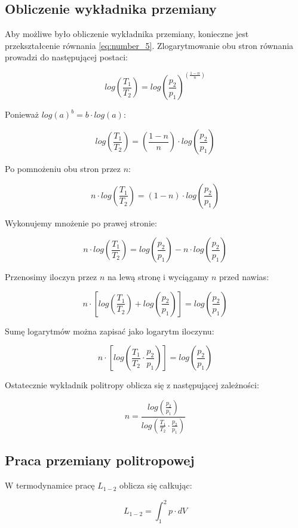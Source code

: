 \subsection{Obliczenie wykładnika przemiany }
Aby możliwe było obliczenie wykładnika przemiany, konieczne jest przekształcenie równania \eqref{eq:number_5}. Zlogarytmowanie obu stron równania prowadzi do następującej postaci:

\[log \left( \frac{T_1}{T_2} \right) = log \left( \frac{p_2}{p_1} \right)^ {\left( \frac{1-n}{n} \right)} \]

Ponieważ $log(a)^b = b\cdot log(a)$:

\[log \left( \frac{T_1}{T_2} \right) = \left( \frac{1-n}{n} \right) \cdot log \left( \frac{p_2}{p_1} \right)\]

Po pomnożeniu obu stron przez $n$:

\[n \cdot log \left( \frac{T_1}{T_2} \right) = \left( {1-n} \right) \cdot log \left( \frac{p_2}{p_1} \right)\]

Wykonujemy mnożenie po prawej stronie:

\[n \cdot log \left( \frac{T_1}{T_2} \right) = log \left( \frac{p_2}{p_1} \right) - n \cdot log \left( \frac{p_2}{p_1} \right)\]

Przenosimy iloczyn przez $n$ na lewą stronę i wyciągamy $n$ przed nawias:

\[n \cdot \left[ log \left( \frac{T_1}{T_2} \right) + log \left( \frac{p_2}{p_1} \right) \right] = log \left( \frac{p_2}{p_1} \right)\]

Sumę logarytmów można zapisać jako logarytm iloczynu:

\[n \cdot \left[ log \left( \frac{T_1}{T_2} \cdot \frac{p_2}{p_1} \right) \right] = log \left( \frac{p_2}{p_1} \right)\]

Ostatecznie wykładnik politropy oblicza się z następującej zależności:

\[n = \frac {log \left( \frac{p_2}{p_1} \right)} {log \left( \frac{T_1}{T_2} \cdot \frac{p_2}{p_1} \right)}  \]



\subsection{Praca przemiany politropowej}
W termodynamice pracę $L_{1-2}$ oblicza się całkując:

\begin{equation}
L_{1-2} = \int_1^2 p\cdot dV
\label{eq:number_7}
\end{equation}


